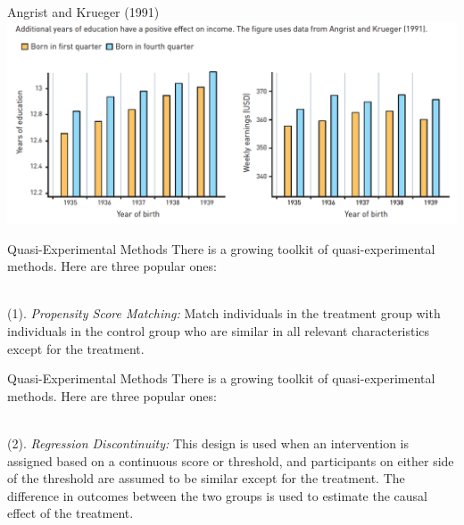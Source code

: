 \documentclass{./../div_teaching_slides}
\begin{document}
\begin{frame}{Angrist and Krueger (1991)}
\centering
\includegraphics[scale=0.34]{angrist-krueger.png}
\end{frame}

\begin{frame}{Quasi-Experimental Methods}
There is a growing toolkit of quasi-experimental methods. Here are three popular ones: \\~\\
\begin{witemize}
 \item[(1).] \textit{Propensity Score Matching:} {Match individuals in the treatment group with individuals in the control group who are similar in all relevant characteristics except for the treatment.}
 \end{witemize}
\end{frame}

\begin{frame}{Quasi-Experimental Methods}
There is a growing toolkit of quasi-experimental methods. Here are three popular ones: \\~\\
\begin{witemize}
  \item[(2).] \textit{Regression Discontinuity:} This design is used when an intervention is assigned based on a continuous score or threshold, and participants on either side of the threshold are assumed to be similar except for the treatment. The difference in outcomes between the two groups is used to estimate the causal effect of the treatment.
 \end{witemize}
\end{frame}
\end{document}
